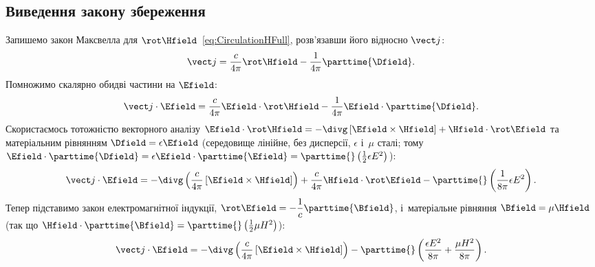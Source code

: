 \subsection*{Виведення закону збереження}


Запишемо закон Максвелла для $\rot\Hfield$~\eqref{eq:CirculationHFull}, розв'язавши його
відносно $\vect j$:
\begin{equation*}
	\vect j = \frac{c}{4\pi}\rot\Hfield - \frac1{4\pi}\parttime{\Dfield}.
\end{equation*}
Помножимо скалярно обидві частини на $\Efield$:
\begin{equation*}
	\vect j\cdot\Efield = \frac{c}{4\pi}\Efield\cdot\rot\Hfield - \frac1{4\pi}\Efield\cdot\parttime{\Dfield}.
\end{equation*}
Скористаємось тотожністю векторного аналізу $\Efield\cdot\rot\Hfield =
-\divg\left[\Efield\times\Hfield\right] + \Hfield\cdot\rot\Efield$ та матеріальним
рівнянням $\Dfield=\epsilon\Efield$ (середовище лінійне, без дисперсії, $\epsilon$ і~$\mu$
сталі; тому $\Efield\cdot\parttime{\Dfield} = \epsilon\Efield\cdot\parttime{\Efield} =
\parttime{}\left(\tfrac12\epsilon E^2\right)$):
\begin{equation*}
	\vect j\cdot\Efield = -\divg\left(\frac{c}{4\pi}\left[\Efield\times\Hfield\right]\right) + \frac{c}{4\pi}\Hfield\cdot\rot\Efield -
	\parttime{}\left(\frac1{8\pi}\epsilon E^2\right).
\end{equation*}
Тепер підставимо закон електромагнітної індукції, $\rot\Efield =
-\dfrac1c\parttime{\Bfield}$, і~матеріальне рівняння $\Bfield=\mu\Hfield$ (так що
$\Hfield\cdot\parttime{\Bfield} = \parttime{}\left(\tfrac12\mu H^2\right)$):
\begin{equation*}
	\vect j\cdot\Efield = -\divg\left(\frac{c}{4\pi}\left[\Efield\times\Hfield\right]\right) - \parttime{}\left(\frac{\epsilon E^2}{8\pi} +
	\frac{\mu H^2}{8\pi}\right).
\end{equation*}


